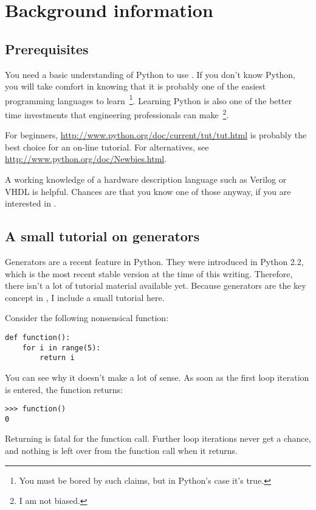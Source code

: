 \chapter{Background information}

\section{Prerequisites}

You need a basic understanding of Python to use \myhdl{}.
If you don't know Python, you will take comfort in knowing
that it is probably one of the easiest programming languages to
learn~\footnote{You must be bored by such claims, but in Python's
case it's true.}. Learning Python is also one of the better time
investments that engineering professionals can make~\footnote{I am not
biased.}.

For beginners, \url{http://www.python.org/doc/current/tut/tut.html} is
probably the best choice for an on-line tutorial. For alternatives,
see \url{http://www.python.org/doc/Newbies.html}.

A working knowledge of a hardware description language such as Verilog
or VHDL is helpful. Chances are that you know one of those anyway, if
you are interested in \myhdl{}.

\section{A small tutorial on generators}

Generators are a recent feature in Python. They were introduced in
Python 2.2, which is the most recent stable version at the time of
this writing. Therefore, there isn't a lot of tutorial material
available yet. Because generators are the key concept in
\myhdl{}, I include a small tutorial here.

Consider the following nonsensical function:

\begin{verbatim}
def function():
    for i in range(5):
        return i

\end{verbatim}

You can see why it doesn't make a lot of sense. As soon as the first
loop iteration is entered, the function returns:

\begin{verbatim}
>>> function()
0
\end{verbatim}

Returning is fatal for the function call. Further loop iterations
never get a chance, and nothing is left over from the function call
when it returns.

